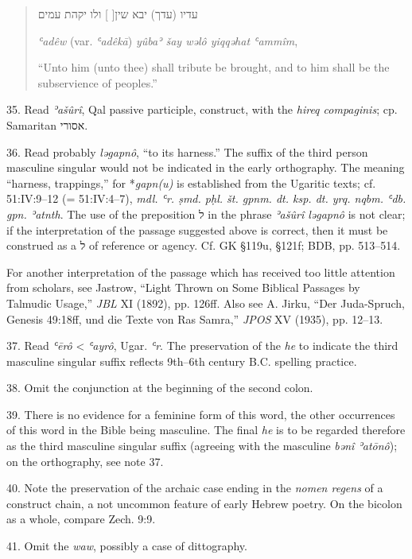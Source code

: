 \begin{enumerate}
\begin{quote}
עדיו (עדך) יבא שין[ ] ולו יקהת עמים

\emph{ʿadêw} (var. \emph{ʿadêkā}) \emph{yûbaʾ šay wəlô yiqqəhat ʿammîm},

``Unto him (unto thee) shall tribute be brought, and to him shall be the
subservience of peoples.''
\end{quote}

35. Read \emph{ʾašûrî}, Qal passive participle, construct, with the
\emph{hireq compaginis}; cp. Samaritan אסורי.

36. Read probably \emph{ləgapnô}, ``to its harness.'' The suffix of the third
person masculine singular would not be indicated in the early orthography.
The meaning ``harness, trappings,'' for *\emph{gapn(u)} is established from
the Ugaritic texts; cf. 51:IV:9--12 (= 51:IV:4--7),
\emph{mdl. ʿr. ṣmd. pḥl. št. gpnm. dt. ksp. dt. yrq. nqbm. ʿdb. gpn.
ʾatnth}. The use of the preposition ל in the phrase \emph{ʾašûrî ləgapnô} is
not clear; if the interpretation of the passage suggested above is correct,
then it must be construed as a ל of reference or agency. Cf. GK §119u, §121f;
BDB, pp. 513--514.

For another interpretation of the passage which has received too little
attention from scholars, see Jastrow, ``Light Thrown on Some Biblical Passages
by Talmudic Usage,'' \emph{JBL} XI (1892), pp. 126ff. Also see A. Jirku,
``Der Juda-Spruch, Genesis 49:18ff, und die Texte von Ras Samra,'' \emph{JPOS}
XV (1935), pp. 12--13.

37. Read \emph{ʿērô} < \emph{ʿayrô}, Ugar. \emph{ʿr}. The preservation of
the \emph{he} to indicate the third masculine singular suffix reflects
9th--6th century B.C. spelling practice.

38. Omit the conjunction at the beginning of the second colon.

39. There is no evidence for a feminine form of this word, the other
occurrences of this word in the Bible being masculine. The final \emph{he} is
to be regarded therefore as the third masculine singular suffix (agreeing with
the masculine \emph{bənî ʾatōnô}); on the orthography, see note 37.

40. Note the preservation of the archaic case ending in the \emph{nomen
regens} of a construct chain, a not uncommon feature of early Hebrew poetry.
On the bicolon as a whole, compare Zech. 9:9.

41. Omit the \emph{waw}, possibly a case of dittography.


\end{enumerate}
